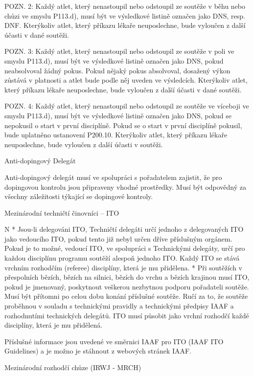 POZN. 2: Každý atlet, který nenastoupil nebo odstoupil ze soutěže v běhu nebo chůzi ve smyslu P113.d), musí být ve výsledkové listině označen jako DNS, resp. DNF. Kterýkoliv atlet, který příkazu lékaře neuposlechne, bude vyloučen z další účasti v dané soutěži.

POZN. 3: Každý atlet, který nenastoupil nebo odstoupil ze soutěže v poli ve smyslu P113.d), musí být ve výsledkové listině označen jako DNS, pokud neabsolvoval žádný pokus. Pokud nějaký pokus absolvoval, dosažený výkon zůstává v platnosti a atlet bude podle něj uveden ve výsledcích. Kterýkoliv atlet, který příkazu lékaře neuposlechne, bude vyloučen z další účasti v dané soutěži.

POZN. 4: Každý atlet, který nenastoupil nebo odstoupil ze soutěže ve víceboji ve smyslu P113.d), musí být ve výsledkové listině označen jako DNS, pokud se nepokusil o start v první disciplíně. Pokud se o start v první disciplíně pokusil, bude uplatněno ustanovení P200.10. Kterýkoliv atlet, který příkazu lékaře neuposlechne, bude vyloučen z další účasti v soutěži.


\secc Anti-dopingový Delegát

Anti-dopingový delegát musí ve spolupráci s pořadatelem zajistit, že pro dopingovou kontrolu jsou připraveny vhodné prostředky.
Musí být odpovědný za všechny záležitosti týkající se dopingové kontroly.

\secc Mezinárodní techničtí činovníci -- ITO

\begitems \style N
* Jsou-li delegováni ITO, Techničtí delegáti určí jednoho z delegovaných ITO jako vedoucího ITO, pokud tento již nebyl určen dříve příslušným orgánem. Pokud je to možné, vedoucí ITO, ve spolupráci s Technickými delegáty, určí pro každou disciplínu programu soutěží alespoň jednoho ITO. Každý ITO se stává vrchním rozhodčím (referee) disciplíny, která je mu přidělena.
* Při soutěžích v přespolních bězích, bězích na silnici, bězích do vrchu a bězích krajinou musí ITO, pokud je jmenovaný, poskytnout veškerou nezbytnou podporu pořadateli soutěže. Musí být přítomni po celou dobu konání příslušné soutěže. Ručí za to, že soutěže proběhnou v souladu s technickými pravidly a technickými předpisy IAAF a rozhodnutími technických delegátů. ITO musí působit jako vrchní rozhodčí každé disciplíny, která je mu přidělená.
\enditems

Příslušné informace jsou uvedené ve směrnici IAAF pro ITO (IAAF ITO Guidelines) a je možno je stáhnout z webových stránek IAAF.

\secc Mezinárodní rozhodčí chůze (IRWJ - MRCH)

